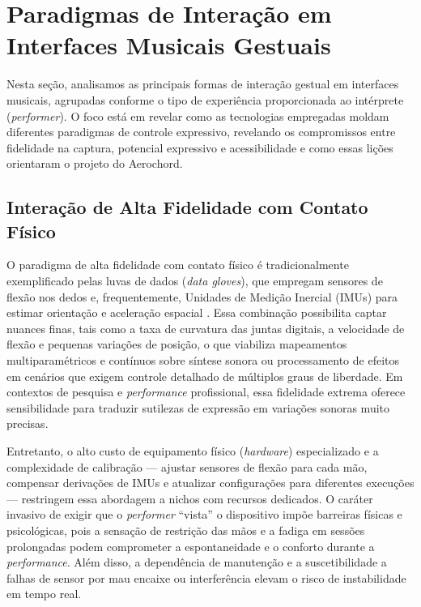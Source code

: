 \section{Paradigmas de Interação em Interfaces Musicais Gestuais}
\label{sec:paradigmas_interacao_interfaces_musicais_gestuais}

Nesta seção, analisamos as principais formas de interação gestual em interfaces musicais, agrupadas conforme o tipo de experiência proporcionada ao intérprete (\textit{performer}). O foco está em revelar como as tecnologias empregadas moldam diferentes paradigmas de controle expressivo, revelando os compromissos entre fidelidade na captura, potencial expressivo e acessibilidade e como essas lições orientaram o projeto do Aerochord.

\subsection{Interação de Alta Fidelidade com Contato Físico}
\label{subsec:iteracao_alta_fidelidade}

O paradigma de alta fidelidade com contato físico é tradicionalmente exemplificado pelas luvas de dados (\textit{data gloves}), que empregam sensores de flexão nos dedos e, frequentemente, Unidades de Medição Inercial (IMUs) para estimar orientação e aceleração espacial \cite{dipietro2008survey, rovan1997instrumental}. Essa combinação possibilita captar nuances finas, tais como a taxa de curvatura das juntas digitais, a velocidade de flexão e pequenas variações de posição, o que viabiliza mapeamentos multiparamétricos e contínuos sobre síntese sonora ou processamento de efeitos em cenários que exigem controle detalhado de múltiplos graus de liberdade. Em contextos de pesquisa e \textit{performance} profissional, essa fidelidade extrema oferece sensibilidade para traduzir sutilezas de expressão em variações sonoras muito precisas.

Entretanto, o alto custo de equipamento físico (\textit{hardware}) especializado e a complexidade de calibração — ajustar sensores de flexão para cada mão, compensar derivações de IMUs e atualizar configurações para diferentes execuções — restringem essa abordagem a nichos com recursos dedicados. O caráter invasivo de exigir que o \textit{performer} “vista” o dispositivo impõe barreiras físicas e psicológicas, pois a sensação de restrição das mãos e a fadiga em sessões prolongadas podem comprometer a espontaneidade e o conforto durante a \textit{performance}. Além disso, a dependência de manutenção e a suscetibilidade a falhas de sensor por mau encaixe ou interferência elevam o risco de instabilidade em tempo real.

